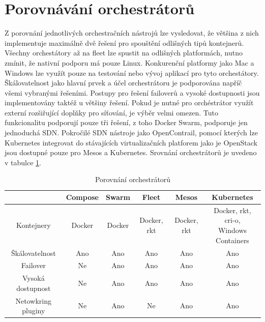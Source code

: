 \section{Porovnávání orchestrátorů}
Z porovnání jednotlivých orchestračních nástrojů lze vysledovat, že většina z nich implementuje maximálně dvě řešení pro spouštění odlišných tipů kontejnerů. Všechny orchestátory až na fleet lze spustit na odlišných platformách, nutno zmínit, že nativní podporu má pouze Linux. Konkurenční platformy jako Mac a Windows lze využít pouze na testování nebo vývoj aplikací pro tyto orchestátory. Škálovatelnost jako hlavní prvek a účel orchestrátoru je podporována napříč všemi vybranými řešeními.  Postupy pro řešení failoverů a vysoké dostupnosti jsou implementovány taktéž u většiny řešení. Pokud je nutné pro orchéstrátor využít externí rozšiřující doplňky pro síťování, je výběr velmi omezen. Tuto funkcionalitu podporují pouze tři řešení, z toho Docker Swarm, podporuje jen jednoduchá SDN. Pokročilé SDN nástroje jako OpenContrail, pomocí kterých lze Kubernetes integrovat do stávajících virtualizačních platforem jako je OpenStack jsou dostupné pouze pro Mesos a Kubernetes. Srovnání orchestrátorů je uvedeno v tabulce \ref{tbl:orch_comp}.

\begin{table}[H]
\begin{center}
\caption{Porovnání orchestrátorů}
\label{tbl:orch_comp}
\begin{tabular}{|c|c|c|c|c|c|}
\hline
  ~   & Compose & Swarm & Fleet & Mesos  &  Kubernetes \\    \hline
Kontejnery          &  Docker &  Docker & Docker, rkt &  Docker, rkt &  \makecell{ Docker, rkt,\\cri-o, \\Windows Containers}  \\    \hline
Škálovatelnost &  Ano &  Ano & Ano &   Ano & Ano \\    \hline
Failover &  Ne & Ano & Ano &  Ano & Ano \\    \hline
Vysoká dostupnost &  Ne  &  Ano & Ano &   Ano & Ano \\    \hline
Netowkring pluginy &  Ne &  Ano & Ne &   Ano & Ano \\    \hline

\end{tabular}
\end{center}
\end{table}

